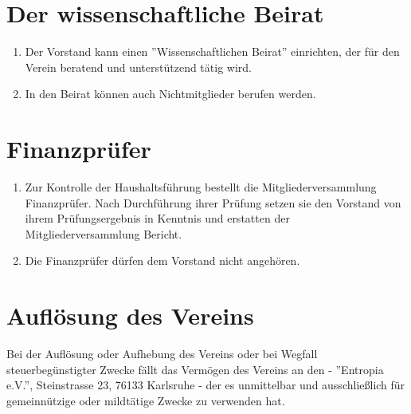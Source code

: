 \documentclass[a4paper, 12pt]{scrartcl}
\begin{document}
\section{Der wissenschaftliche Beirat}
     \begin{enumerate}
	  \item Der Vorstand kann einen ”Wissenschaftlichen Beirat” einrichten, der für den Verein beratend und unterstützend tätig wird.  
	  \item In den Beirat können auch Nichtmitglieder berufen werden.
     \end{enumerate}

\section{Finanzprüfer}
     \begin{enumerate}
	  \item Zur Kontrolle der Haushaltsführung bestellt die Mitgliederversammlung Finanzprüfer. Nach Durchführung ihrer Prüfung setzen sie den Vorstand von ihrem Prüfungsergebnis in Kenntnis und erstatten der Mitgliederversammlung Bericht.  
	  \item Die Finanzprüfer dürfen dem Vorstand nicht angehören.
     \end{enumerate}


\section{Auflösung des Vereins}
Bei  der Auflösung  oder Aufhebung des Vereins oder bei Wegfall steuerbegünstigter Zwecke fällt das Vermögen des Vereins an den - ”Entropia e.V.”, Steinstrasse 23, 76133 Karlsruhe - der es unmittelbar und ausschließlich für gemeinnützige oder mildtätige Zwecke zu verwenden hat.      
\end{document}
